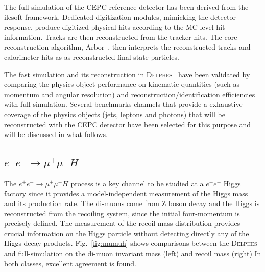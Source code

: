\documentclass[a4paper,10pt,twoside]{cpc-hepnp}
\begin{document}
\begin{multicols}{2}
The full simulation of the CEPC reference detector has been derived from the ilcsoft framework.
Dedicated digitization modules, mimicking the detector response, produce digitized physical hits according to the MC level hit information. 
Tracks are then reconstructed from the tracker hits. 
The core reconstruction algorithm, Arbor~\cite{ref:arbor}, then interprets the reconstructed tracks and calorimeter hits as as reconstructed final state particles. 

The fast simulation and its reconstruction in {\textsc{Delphes}~} have been validated by comparing the physics object performance on kinematic quantities (such as momentum and angular resolution) and reconstruction/identification efficiencies with full-simulation. 
Several benchmarks channels that provide a exhaustive coverage of the physics objects (jets, leptons and photons) that will be reconstructed with the CEPC detector have been selected for this purpose and will be discussed in what follows.

\subsection{$e^+e^-\to \mu^+\mu^-H$}

The $e^+e^- \to \mu^+\mu^-H$ process is a key channel to be studied at a $e^+e^-$ Higgs factory since it provides a model-independent measurement of the Higgs mass and its production rate.
The di-muons come from Z boson decay and the Higgs is reconstructed from the recoiling system, since the initial four-momentum is precisely defined.
The measurement of the recoil mass distribution provides crucial information on the Higgs particle without detecting directly any of the Higgs decay products. 
Fig.~\ref{fig:mumuh} shows comparisons between the {\textsc{Delphes}~} and full-simulation on the di-muon invariant mass (left) and recoil mass (right)
In both classes, excellent agreement is found. 


\end{multicols}
\end{document}
